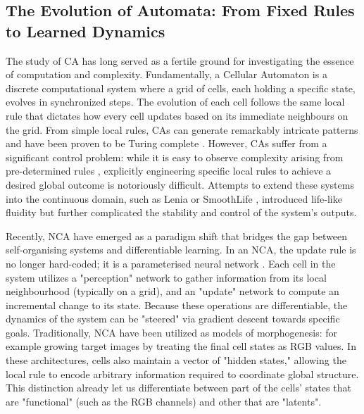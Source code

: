 \subsection*{The Evolution of Automata: From Fixed Rules to Learned Dynamics}
The study of \acf{CA} has long served as a fertile ground for investigating the essence of computation and complexity. Fundamentally, a Cellular Automaton is a discrete computational system where a grid of cells, each holding a specific state, evolves in synchronized steps. The evolution of each cell follows the same local rule that dictates how every cell updates based on its immediate neighbours on the grid. From simple local rules, CAs can generate remarkably intricate patterns and have been proven to be Turing complete \citep{cook}. 
However, CAs suffer from a significant control problem: while it is easy to observe complexity arising from pre-determined rules \citep{wolfram}, explicitly engineering specific local rules to achieve a desired global outcome is notoriously difficult.
Attempts to extend these systems into the continuous domain, such as Lenia  or SmoothLife \citep{lenia, smoothlife}, introduced life-like fluidity but further complicated the stability and control of the system's outputs.

Recently, \acf{NCA} have emerged as a paradigm shift that bridges the gap between self-organising systems and differentiable learning. In an NCA, the update rule is no longer hard-coded; it is a parameterised neural network \citep{mordvintsev_growing_2020}.
Each cell in the system utilizes a "perception" network to gather information from its local neighbourhood (typically on a grid), and an "update" network to compute an incremental change to its state. 
Because these operations are differentiable, the dynamics of the system can be "steered" via gradient descent towards specific goals. 
Traditionally, NCA have been utilized as models of morphogenesis: for example growing target images by treating the final cell states as RGB values. In these architectures, cells also maintain a vector of "hidden states," allowing the local rule to encode arbitrary information required to coordinate global structure. This distinction already let us differentiate between part of the cells' states that are "functional" (such as the RGB channels) and other that are "latents".


